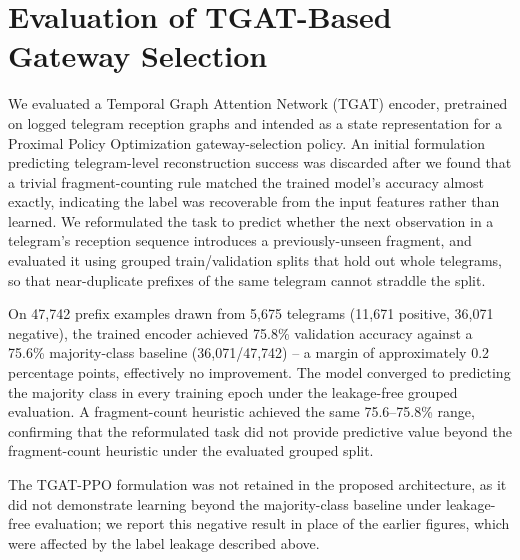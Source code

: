 \documentclass[journal]{IEEEtran}
\begin{document}
\appendices
\section{Evaluation of TGAT-Based Gateway Selection}
\label{app:tgat}

We evaluated a Temporal Graph Attention Network (TGAT) encoder, pretrained on logged telegram reception graphs and intended as a state representation for a Proximal Policy Optimization gateway-selection policy. An initial formulation predicting telegram-level reconstruction success was discarded after we found that a trivial fragment-counting rule matched the trained model's accuracy almost exactly, indicating the label was recoverable from the input features rather than learned. We reformulated the task to predict whether the next observation in a telegram's reception sequence introduces a previously-unseen fragment, and evaluated it using grouped train/validation splits that hold out whole telegrams, so that near-duplicate prefixes of the same telegram cannot straddle the split.

On 47{,}742 prefix examples drawn from 5{,}675 telegrams (11{,}671 positive, 36{,}071 negative), the trained encoder achieved 75.8\% validation accuracy against a 75.6\% majority-class baseline (36{,}071/47{,}742) -- a margin of approximately 0.2 percentage points, effectively no improvement. The model converged to predicting the majority class in every training epoch under the leakage-free grouped evaluation. A fragment-count heuristic achieved the same 75.6--75.8\% range, confirming that the reformulated task did not provide predictive value beyond the fragment-count heuristic under the evaluated grouped split.

The TGAT-PPO formulation was not retained in the proposed architecture, as it did not demonstrate learning beyond the majority-class baseline under leakage-free evaluation; we report this negative result in place of the earlier figures, which were affected by the label leakage described above.
\end{document}
